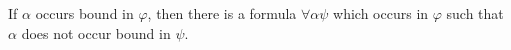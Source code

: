 If $\alpha$ occurs bound in $\varphi$, then there is a formula $\forall \alpha \psi$ which occurs in $\varphi$ such that $\alpha$ does not occur bound in $\psi$.
